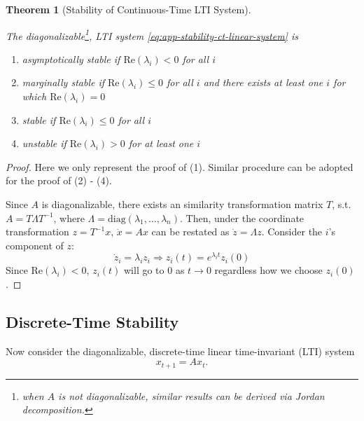 \documentclass[
]{book}
\newtheorem{theorem}{Theorem}[chapter]
\theoremstyle{definition}
\theoremstyle{definition}
\theoremstyle{definition}
\theoremstyle{definition}
\theoremstyle{remark}
\begin{document}
\begin{theorem}[Stability of Continuous-Time LTI System]
\protect\hypertarget{thm:ltistable}{}\label{thm:ltistable}

The diagonalizable\footnote{when \(A\) is not diagonalizable, similar results can be derived via Jordan decomposition.}, LTI system \eqref{eq:app-stability-ct-linear-system} is

\begin{enumerate}
\def\labelenumi{\arabic{enumi}.}
\item
  asymptotically stable if \(\text{Re} (\lambda_i) < 0\) for all \(i\)
\item
  marginally stable if \(\text{Re} (\lambda_i) \le 0\) for all \(i\) and there exists at least one \(i\) for which \(\text{Re} (\lambda_i) = 0\)
\item
  stable if \(\text{Re} (\lambda_i) \le 0\) for all \(i\)
\item
  unstable if \(\text{Re} (\lambda_i) > 0\) for at least one \(i\)
\end{enumerate}

\end{theorem}

\begin{proof}

Here we only represent the proof of (1). Similar procedure can be adopted for the proof of (2) - (4).

Since \(A\) is diagonalizable, there exists an similarity transformation matrix \(T\), s.t. \(A = T \Lambda T^{-1}\), where \(\Lambda = \text{diag}(\lambda_1, \dots, \lambda_n)\). Then, under the coordinate transformation \(z = T^{-1} x\), \(\dot{x} = Ax\) can be restated as \(\dot{z} = \Lambda z\). Consider the \(i\)'s component of \(z\):
\begin{equation*}
   \dot{z}_i = \lambda_i z_i \Longrightarrow z_i(t) = e^{\lambda_i t} z_i(0)
\end{equation*}
Since \(\text{Re}(\lambda_i) < 0\), \(z_i(t)\) will go to \(0\) as \(t \rightarrow 0\) regardless how we choose \(z_i(0)\).

\end{proof}

\subsection{Discrete-Time Stability}\label{app-lti-stability-dt}

Now consider the diagonalizable, discrete-time linear time-invariant (LTI) system
\begin{equation}
x_{t+1} = A x_t.
\label{eq:app-stability-dt-linear-system}
\end{equation}
\end{document}
